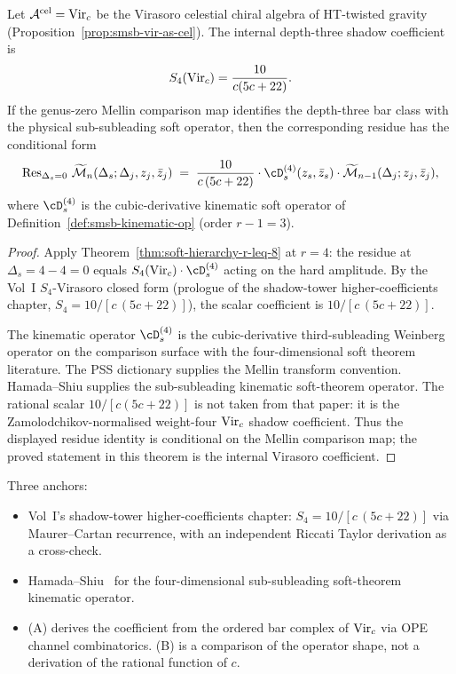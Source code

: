 \begin{theorem}[$r = 4$ Virasoro shadow coefficient]
\label{thm:r-eq-4-is-leading-subsubleading}
\ClaimStatusProvedHere
Let $\mathcal A^{\mathrm{cel}} = \mathrm{Vir}_c$ be the Virasoro celestial chiral
algebra of HT-twisted gravity
(Proposition~\ref{prop:smsb-vir-as-cel}). The internal depth-three
shadow coefficient is
\[
S_4(\mathrm{Vir}_c)=\frac{10}{c(5c+22)}.
\]
If the genus-zero Mellin comparison map identifies the depth-three
bar class with the physical sub-subleading soft operator, then the
corresponding residue has the conditional form
\[
 \Res_{\Delta_s = 0}\,\Mel\cM_n(\Delta_s; \Delta_j, z_j, \bar z_j)
 \;=\;
 \frac{10}{c\,(5 c + 22)}\cdot
 \cD_s^{(4)}(z_s, \bar z_s)\cdot
 \Mel\cM_{n - 1}(\Delta_j; z_j, \bar z_j),
\]
where $\cD_s^{(4)}$ is the cubic-derivative kinematic soft operator of
Definition~\ref{def:smsb-kinematic-op} (order $r - 1 = 3$).
\end{theorem}

\begin{proof}
Apply Theorem~\ref{thm:soft-hierarchy-r-leq-8} at $r = 4$: the residue
at $\Delta_s = 4 - 4 = 0$ equals $S_4(\Vir_c)\cdot \cD_s^{(4)}$ acting
on the hard amplitude. By the Vol~I $S_4$-Virasoro closed form
(prologue of the shadow-tower higher-coefficients chapter,
$S_4 = 10 / [c\,(5 c + 22)]$), the scalar coefficient is
$10 / [c\,(5 c + 22)]$.

The kinematic operator $\cD_s^{(4)}$ is the cubic-derivative
third-subleading Weinberg operator on the comparison surface with the
four-dimensional soft theorem literature.  The PSS dictionary
\cite[\S 3]{PasterskiShaoStromingerFlatSpaceHolog} supplies the
Mellin transform convention.  Hamada--Shiu
\cite{HamadaShiuSubsubSoft} supplies the sub-subleading kinematic
soft-theorem operator.  The rational scalar
\(10/[c(5c+22)]\) is not taken from that paper: it is the
Zamolodchikov-normalised weight-four \(\mathrm{Vir}_c\) shadow coefficient.
Thus the displayed residue identity is conditional on the Mellin
comparison map; the proved statement in this theorem is the internal
Virasoro coefficient.
\end{proof}

\begin{remark}
\label{rem:smsb-independent-verification-r-eq-4}
Three anchors:
\begin{itemize}
\item[(A)] Vol~I's shadow-tower higher-coefficients chapter:
$S_4 = 10/[c\,(5c + 22)]$ via Maurer--Cartan recurrence, with an
independent Riccati Taylor derivation as a cross-check.
\item[(B)] Hamada--Shiu~\cite{HamadaShiuSubsubSoft} for the
four-dimensional sub-subleading soft-theorem kinematic operator.
\item[(C)] (A) derives the coefficient from the ordered bar complex of
\(\mathrm{Vir}_c\) via OPE channel combinatorics.  (B) is a comparison of the
operator shape, not a derivation of the rational function of \(c\).
\end{itemize}
\end{remark}

